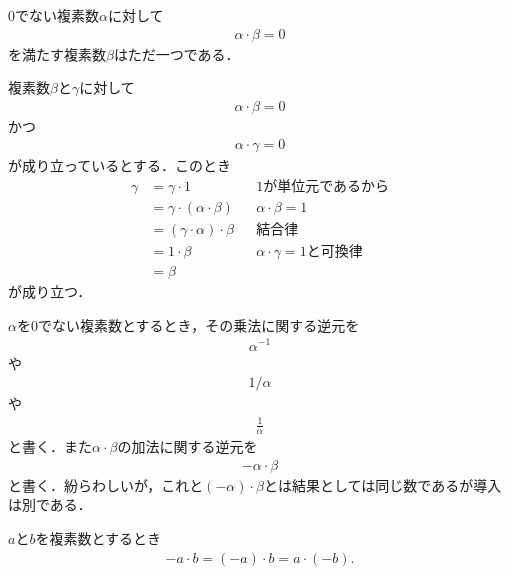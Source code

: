 	\begin{screen}
		\begin{thm}[乗法に関する逆元はただ一つ]
			$0$でない複素数$\alpha$に対して
			\begin{align}
				\alpha \cdot \beta = 0
			\end{align}
			を満たす複素数$\beta$はただ一つである．
		\end{thm}
	\end{screen}
	
	\begin{sketch}
		複素数$\beta$と$\gamma$に対して
		\begin{align}
			\alpha \cdot \beta = 0
		\end{align}
		かつ
		\begin{align}
			\alpha \cdot \gamma = 0
		\end{align}
		が成り立っているとする．このとき
		\begin{align}
			\gamma &= \gamma \cdot 1 &&\mbox{$1$が単位元であるから} \\
			&= \gamma \cdot (\alpha \cdot \beta) &&\mbox{$\alpha \cdot \beta = 1$} \\
			&= (\gamma \cdot \alpha) \cdot \beta &&\mbox{結合律} \\
			&= 1 \cdot \beta &&\mbox{$\alpha \cdot \gamma = 1$と可換律} \\
			&= \beta
		\end{align}
		が成り立つ．
		\QED
	\end{sketch}
	
	$\alpha$を$0$でない複素数とするとき，その乗法に関する逆元を
	\begin{align}
		\alpha^{-1}
	\end{align}
	や
	\begin{align}
		1/\alpha
	\end{align}
	や
	\begin{align}
		\frac{1}{\alpha}
	\end{align}
	と書く．また$\alpha \cdot \beta$の加法に関する逆元を
	\begin{align}
		- \alpha \cdot \beta
	\end{align}
	と書く．紛らわしいが，これと$(-\alpha) \cdot \beta$とは結果としては同じ数であるが導入は別である．
	
	\begin{screen}
		\begin{thm}[積の逆元は逆元の積]
		\label{thm:inverse_of_product}
			$a$と$b$を複素数とするとき
			\begin{align}
				-a \cdot b = (-a) \cdot b = a \cdot (-b).
			\end{align}
		\end{thm}
	\end{screen}
	
